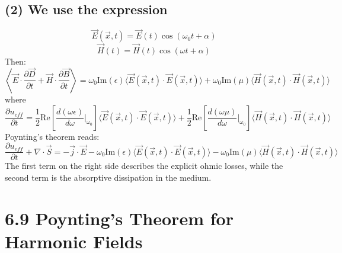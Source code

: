 \documentclass{article}
\begin{document}
	\subsection*{(2) We use the expression}
	\[
	\vec{E}(\vec{x}, t) = \vec{E}(t) \cos(\omega_0 t + \alpha)
	\]
	\[
	\vec{H}(t) = \vec{H}(t) \cos(\omega t + \alpha)
	\]
	Then:
	\[
	\left\langle \vec{E} \cdot \frac{\partial\vec{D}}{\partial t} + \vec{H} \cdot \frac{\partial\vec{B}}{\partial t} \right\rangle = \omega_0 \text{Im}(\epsilon) \langle \vec{E}(\vec{x},t) \cdot \vec{E}(\vec{x},t) \rangle + \omega_0 \text{Im}(\mu) \langle \vec{H}(\vec{x},t) \cdot \vec{H}(\vec{x},t) \rangle
	\]
	where
	\[
	\frac{\partial u_{eff}}{\partial t} = \frac{1}{2} \text{Re} \left[ \frac{d(\omega\epsilon)}{d\omega} \bigg|_{\omega_0} \right] \langle \vec{E}(\vec{x},t) \cdot \vec{E}(\vec{x},t) \rangle + \frac{1}{2} \text{Re} \left[ \frac{d(\omega\mu)}{d\omega} \bigg|_{\omega_0} \right] \langle \vec{H}(\vec{x},t) \cdot \vec{H}(\vec{x},t) \rangle
	\]
	Poynting's theorem reads:
	\[
	\frac{\partial u_{eff}}{\partial t} + \nabla \cdot \vec{S} = - \vec{j} \cdot \vec{E} - \omega_0 \text{Im}(\epsilon) \langle \vec{E}(\vec{x},t) \cdot \vec{E}(\vec{x},t) \rangle - \omega_0 \text{Im}(\mu) \langle \vec{H}(\vec{x},t) \cdot \vec{H}(\vec{x},t) \rangle
	\]
	The first term on the right side describes the explicit ohmic losses, while the second term is the absorptive dissipation in the medium.
	
	\section*{6.9 Poynting's Theorem for Harmonic Fields}
\end{document}

